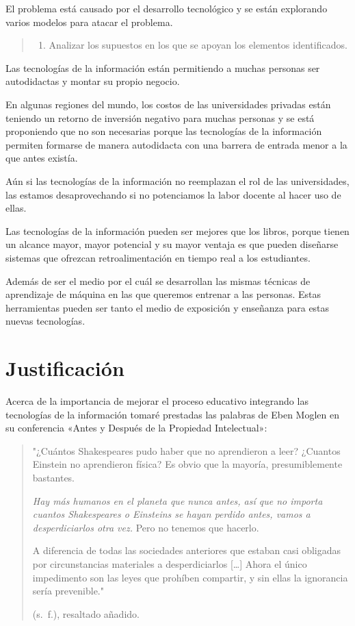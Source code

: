 \documentclass[
  12,
]{scrartcl}
\providecommand{\tightlist}{%
  \setlength{\itemsep}{0pt}\setlength{\parskip}{0pt}}
\begin{document}
El problema está causado por el desarrollo tecnológico y se están
explorando varios modelos para atacar el problema.

\begin{quote}
\begin{enumerate}
\def\labelenumi{\arabic{enumi}.}
\setcounter{enumi}{6}
\tightlist
\item
  Analizar los supuestos en los que se apoyan los elementos
  identificados.
\end{enumerate}
\end{quote}

Las tecnologías de la información están permitiendo a muchas personas
ser autodidactas y montar su propio negocio.

En algunas regiones del mundo, los costos de las universidades privadas
están teniendo un retorno de inversión negativo para muchas personas y
se está proponiendo que no son necesarias porque las tecnologías de la
información permiten formarse de manera autodidacta con una barrera de
entrada menor a la que antes existía.

Aún si las tecnologías de la información no reemplazan el rol de las
universidades, las estamos desaprovechando si no potenciamos la labor
docente al hacer uso de ellas.

Las tecnologías de la información pueden ser mejores que los libros,
porque tienen un alcance mayor, mayor potencial y su mayor ventaja es
que pueden diseñarse sistemas que ofrezcan retroalimentación en tiempo
real a los estudiantes.

Además de ser el medio por el cuál se desarrollan las mismas técnicas de
aprendizaje de máquina en las que queremos entrenar a las personas.
Estas herramientas pueden ser tanto el medio de exposición y enseñanza
para estas nuevas tecnologías.

\hypertarget{justificaciuxf3n}{%
\section{Justificación}\label{justificaciuxf3n}}

Acerca de la importancia de mejorar el proceso educativo integrando las
tecnologías de la información tomaré prestadas las palabras de Eben
Moglen en su conferencia «Antes y Después de la Propiedad Intelectual»:

\begin{quote}
"¿Cuántos Shakespeares pudo haber que no aprendieron a leer? ¿Cuantos
Einstein no aprendieron física? Es obvio que la mayoría, presumiblemente
bastantes.

\emph{Hay más humanos en el planeta que nunca antes, así que no importa
cuantos Shakespeares o Einsteins se hayan perdido antes, vamos a
desperdiciarlos otra vez.} Pero no tenemos que hacerlo.

A diferencia de todas las sociedades anteriores que estaban casi
obligadas por circunstancias materiales a desperdiciarlos {[}\ldots{]}
Ahora el único impedimento son las leyes que prohíben compartir, y sin
ellas la ignorancia sería prevenible."

(s.~f.), resaltado añadido.
\end{quote}
\end{document}
